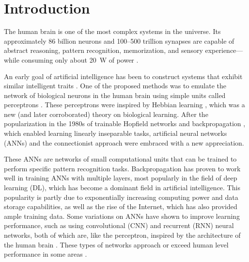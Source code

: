 \chapter{Introduction}\label{ch:introduction}

The human brain is one of the most complex systems in the universe.
Its approximately 86 billion neurons \citep{azevedo2009equal} and 100--500 trillion synapses \citep{drachman2005we} are capable of abstract reasoning, pattern recognition, memorization, and sensory experience---while consuming only about \SI{20}{\watt} of power \citep{sokoloff1960metabolism,drubach2000brain}.

An early goal of artificial intelligence has been to construct systems that exhibit similar intelligent traits \citep{turing1948intelligent}.
One of the proposed methods was to emulate the network of biological neurons in the human brain using simple units called perceptrons \citep{rosenblatt1958perceptron}.
These perceptrons were inspired by Hebbian learning \citep{hebb1949organization}, which was a new (and later corroborated) theory on biological learning.
After the popularization in the 1980s of trainable Hopfield networks \citep{hopfield1982neural} and backpropagation \citep{rumelhart1986learning}, which enabled learning linearly inseparable tasks, artificial neural networks (ANNs) and the connectionist approach were embraced with a new appreciation.

These ANNs are networks of small computational units that can be trained to perform specific pattern recognition tasks.
Backpropagation has proven to work well in training ANNs with multiple layers, most popularly in the field of deep learning (DL), which has become a dominant field in artificial intelligence.
This popularity is partly due to exponentially increasing computing power and data storage capabilities, as well as the rise of the Internet, which has also provided ample training data.
Some variations on ANNs have shown to improve learning performance, such as using convolutional (CNN) and recurrent (RNN) neural networks, both of which are, like the perceptron, inspired by the architecture of the human brain \citep{hubel1968receptive, fukushima1982neocognitron,lecun1995convolutional,lukovsevivcius2009reservoir}.
These types of networks approach or exceed human level performance in some areas \citep{schmidhuber2015deep}.

